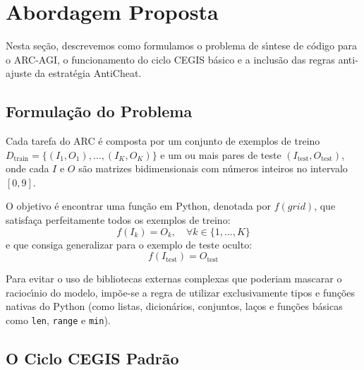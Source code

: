 \section{Abordagem Proposta}
\label{sec:proposta}

Nesta se\c{c}\~{a}o, descrevemos como formulamos o problema de s\'{\i}ntese de c\'{o}digo para o ARC-AGI, o funcionamento do ciclo CEGIS b\'{a}sico e a inclus\~{a}o das regras anti-ajuste da estrat\'{e}gia AntiCheat.

\subsection{Formula\c{c}\~{a}o do Problema}

Cada tarefa do ARC \'{e} composta por um conjunto de exemplos de treino $D_{\text{train}} = \{(I_1, O_1), \dots, (I_K, O_K)\}$ e um ou mais pares de teste $(I_{\text{test}}, O_{\text{test}})$, onde cada $I$ e $O$ s\~{a}o matrizes bidimensionais com n\'{u}meros inteiros no intervalo $[0, 9]$.

O objetivo \'{e} encontrar uma fun\c{c}\~{a}o em Python, denotada por $f(grid)$, que satisfa\c{c}a perfeitamente todos os exemplos de treino:
\begin{equation}
    f(I_k) = O_k, \quad \forall k \in \{1, \dots, K\}
\end{equation}
e que consiga generalizar para o exemplo de teste oculto:
\begin{equation}
    f(I_{\text{test}}) = O_{\text{test}}
\end{equation}

Para evitar o uso de bibliotecas externas complexas que poderiam mascarar o racioc\'{\i}nio do modelo, imp\~{o}e-se a regra de utilizar exclusivamente tipos e fun\c{c}\~{o}es nativas do Python (como listas, dicion\'{a}rios, conjuntos, la\c{c}os e fun\c{c}\~{o}es b\'{a}sicas como \texttt{len}, \texttt{range} e \texttt{min}).

\subsection{O Ciclo CEGIS Padr\~{a}o}

